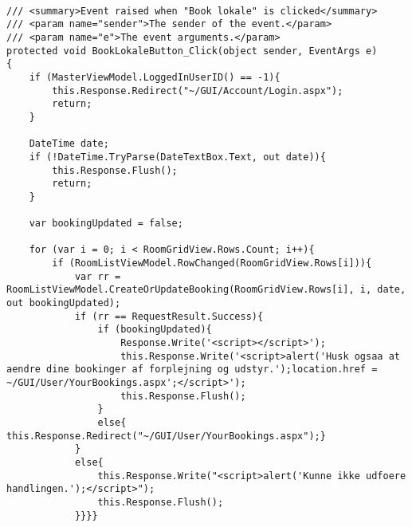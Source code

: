 \begin{lstlisting}[caption= BookLokale event til oprettelse af booking]

/// <summary>Event raised when "Book lokale" is clicked</summary>
/// <param name="sender">The sender of the event.</param>
/// <param name="e">The event arguments.</param>
protected void BookLokaleButton_Click(object sender, EventArgs e)
{
	if (MasterViewModel.LoggedInUserID() == -1){
		this.Response.Redirect("~/GUI/Account/Login.aspx");
		return;
	}

	DateTime date;
	if (!DateTime.TryParse(DateTextBox.Text, out date)){
		this.Response.Flush();
		return;
	}

	var bookingUpdated = false;

	for (var i = 0; i < RoomGridView.Rows.Count; i++){
		if (RoomListViewModel.RowChanged(RoomGridView.Rows[i])){
			var rr = RoomListViewModel.CreateOrUpdateBooking(RoomGridView.Rows[i], i, date, out bookingUpdated);
			if (rr == RequestResult.Success){
				if (bookingUpdated){
					Response.Write('<script></script>');
					this.Response.Write('<script>alert('Husk ogsaa at aendre dine bookinger af forplejning og udstyr.');location.href = ~/GUI/User/YourBookings.aspx';</script>');
					this.Response.Flush();
				}
				else{ this.Response.Redirect("~/GUI/User/YourBookings.aspx");}
			}
			else{
				this.Response.Write("<script>alert('Kunne ikke udfoere handlingen.');</script>");
				this.Response.Flush();
			}}}}
\end{lstlisting}